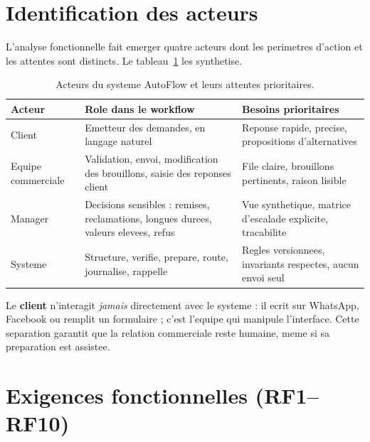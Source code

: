 \documentclass[12pt,a4paper,openany]{report}
\begin{document}
\section{Identification des acteurs}

L'analyse fonctionnelle fait emerger quatre acteurs dont les perimetres d'action et les attentes sont distincts. Le tableau~\ref{tab:acteurs} les synthetise.

\begin{table}[H]\centering\small
\caption{Acteurs du systeme AutoFlow et leurs attentes prioritaires.}
\label{tab:acteurs}
\begin{tabularx}{\textwidth}{l X X}\toprule
\rowcolor{layerPres!30}\textbf{Acteur} & \textbf{Role dans le workflow} & \textbf{Besoins prioritaires}\\\midrule
Client              & Emetteur des demandes, en langage naturel & Reponse rapide, precise, propositions d'alternatives\\
Equipe commerciale  & Validation, envoi, modification des brouillons, saisie des reponses client & File claire, brouillons pertinents, raison lisible\\
Manager             & Decisions sensibles : remises, reclamations, longues durees, valeurs elevees, refus & Vue synthetique, matrice d'escalade explicite, tracabilite\\
Systeme             & Structure, verifie, prepare, route, journalise, rappelle & Regles versionnees, invariants respectes, aucun envoi seul\\
\bottomrule
\end{tabularx}
\end{table}

Le \textbf{client} n'interagit \emph{jamais} directement avec le systeme : il ecrit sur WhatsApp, Facebook ou remplit un formulaire ; c'est l'equipe qui manipule l'interface. Cette separation garantit que la relation commerciale reste humaine, meme si sa preparation est assistee.

\section{Exigences fonctionnelles (RF1--RF10)}
\end{document}
